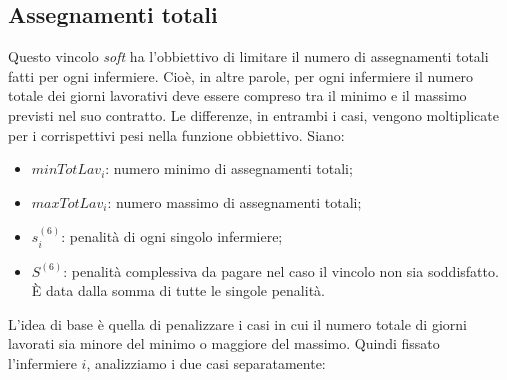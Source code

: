 \subsection{Assegnamenti totali}
Questo vincolo \textit{soft} ha l'obbiettivo di limitare il numero di assegnamenti totali fatti per ogni infermiere. Cioè, in altre parole, per ogni infermiere il numero totale dei giorni lavorativi deve essere compreso tra il minimo e il massimo previsti nel suo contratto. Le differenze, in entrambi i casi, vengono moltiplicate per i corrispettivi pesi nella funzione obbiettivo.
Siano:
\begin{itemize}
\item $minTotLav_i$: numero minimo di assegnamenti totali;
\item $maxTotLav_i$: numero massimo di assegnamenti totali;
\item $s^{(6)}_{i}$: penalità di ogni singolo infermiere;
\item $S^{(6)}$: penalità complessiva da pagare nel caso il vincolo non sia soddisfatto.
È data dalla somma di tutte le singole penalità.
\end{itemize}
L'idea di base è quella di penalizzare i casi in cui il numero totale di giorni lavorati sia minore del minimo o maggiore del massimo.
Quindi fissato l'infermiere $i$, analizziamo i due casi separatamente:
